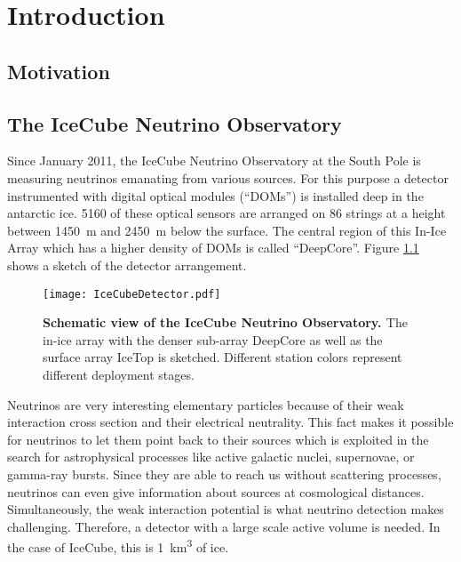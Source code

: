 \chapter{Introduction}


\section{Motivation}


\section{The IceCube Neutrino Observatory}

Since January 2011, the IceCube Neutrino Observatory at the South Pole is measuring neutrinos emanating from various sources. For this purpose a detector instrumented with digital optical modules (\enquote{DOMs}) is installed deep in the antarctic ice. 5160 of these optical sensors are arranged on 86 strings at a height between \SI{1450}{\meter} and \SI{2450}{\meter} below the surface. The central region of this In-Ice Array which has a higher density of DOMs is called \enquote{DeepCore}. Figure \ref{icecube:detector} shows a sketch of the detector arrangement.

\begin{figure}[h]
	\texttt{[image: IceCubeDetector.pdf]}
	\caption[Schematic view of IceCube]{\textbf{Schematic view of the IceCube Neutrino Observatory. \cite{icecube:instrumentation}} The in-ice array with the denser sub-array DeepCore as well as the surface array IceTop is sketched. Different station colors represent different deployment stages.}
	\label{icecube:detector}
\end{figure}

Neutrinos are very interesting elementary particles because of their weak interaction cross section and their electrical neutrality. This fact makes it possible for neutrinos to let them point back to their sources which is exploited in the search for astrophysical processes like active galactic nuclei, supernovae, or gamma-ray bursts. Since they are able to reach us without scattering processes, neutrinos can even give information about sources at cosmological distances. Simultaneously, the weak interaction potential is what neutrino detection makes challenging. Therefore, a detector with a large scale active volume is needed. In the case of IceCube, this is \SI{1}{\cubic\kilo\meter} of ice.

